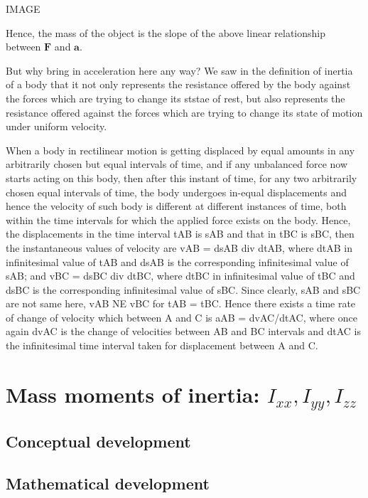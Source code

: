 
IMAGE


Hence, the mass of the object is the slope of the above linear relationship between $\mathbf{F}$ and $\mathbf{a}$.

But why bring in acceleration here any way? We saw in the definition of inertia of a body that it not only represents the resistance offered by the body against the forces which are trying to change its ststae of rest, but also represents the resistance offered against the forces which are trying to change its state of motion under uniform velocity. 
 
When a body in rectilinear motion is getting displaced by equal amounts in any arbitrarily chosen but equal intervals of time, and if any unbalanced force now starts acting on this body, then after this instant of time, for any two arbitrarily chosen equal intervals of time, the body undergoes in-equal displacements and hence the velocity of such body is different at different instances of time, both within the time intervals for which the applied force exists on the body. Hence, the displacements in the time interval tAB is sAB and that in tBC is sBC, then the instantaneous values of velocity are vAB = dsAB div dtAB, where dtAB in infinitesimal value of tAB and dsAB is the corresponding infinitesimal value of sAB; and vBC = dsBC div dtBC, where dtBC in infinitesimal value of tBC and dsBC is the corresponding infinitesimal value of sBC. Since clearly, sAB and sBC are not same here, vAB NE vBC for tAB = tBC. Hence there exists a time rate of change of velocity which between A and C is aAB = dvAC/dtAC, where once again dvAC is the change of velocities between AB and BC intervals and dtAC is the infinitesimal time interval taken for displacement between A and C.

\section{Mass moments of inertia: $I_{xx}, I_{yy}, I_{zz}$}
\subsection{Conceptual development}
\subsection{Mathematical development}
